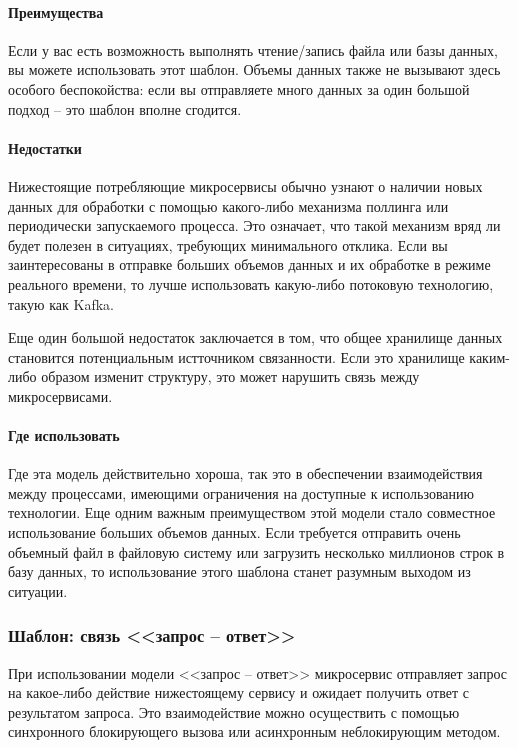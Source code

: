 \documentclass[%
	11pt,
	a4paper,
	utf8,
		]{article}
\begin{document}
\paragraph{Преимущества}

Если у вас есть возможность выполнять чтение/запись файла или базы данных, вы можете использовать этот шаблон. Объемы данных также не вызывают здесь особого беспокойства: если вы отправляете много данных за один большой подход -- это шаблон вполне сгодится.

\paragraph{Недостатки}

Нижестоящие потребляющие микросервисы обычно узнают о наличии новых данных для обработки с помощью какого-либо механизма поллинга или периодически запускаемого процесса. Это означает, что такой механизм вряд ли будет полезен в ситуациях, требующих минимального отклика. Если вы заинтересованы в отправке больших объемов данных и их обработке в режиме реального времени, то лучше использовать какую-либо потоковую технологию, такую как Kafka.

Еще один большой недостаток заключается в том, что общее хранилище данных становится потенциальным истточником связанности. Если это хранилище каким-либо образом изменит структуру, это может нарушить связь между микросервисами.

\paragraph{Где использовать}

Где эта модель действительно хороша, так это в обеспечении взаимодействия между процессами, имеющими ограничения на доступные к использованию технологии. Еще одним важным преимуществом этой модели стало совместное использование больших объемов данных. Если требуется отправить очень объемный файл в файловую систему или загрузить несколько миллионов строк в базу данных, то использование этого шаблона станет разумным выходом из ситуации.

\subsubsection{Шаблон: связь <<запрос -- ответ>>}

При использовании модели <<запрос -- ответ>> микросервис отправляет запрос на какое-либо действие нижестоящему сервису и ожидает получить ответ с результатом запроса. Это взаимодействие можно осуществить с помощью синхронного блокирующего вызова или асинхронным неблокирующим методом.
\end{document}
